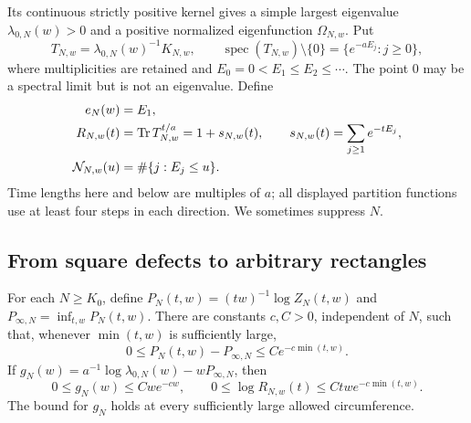 Its continuous strictly positive kernel gives a simple largest
eigenvalue $\lambda_{0,N}(w)>0$ and a positive normalized eigenfunction
$\Omega_{N,w}$.  Put
\begin{equation}
 T_{N,w}=\lambda_{0,N}(w)^{-1}K_{N,w},\qquad
 \operatorname{spec}(T_{N,w})\setminus\{0\}
     =\{e^{-aE_j}:j\ge0\},
 \label{tra:energies}
\end{equation}
where multiplicities are retained and $E_0=0<E_1\le E_2\le\cdots$.
The point $0$ may be a spectral limit but is not an eigenvalue.
Define
\begin{equation}
 \begin{split}
 e_N(w)&=E_1,\\
 R_{N,w}(t)&=\operatorname{Tr} T_{N,w}^{t/a}=1+s_{N,w}(t),
 \qquad s_{N,w}(t)=\sum_{j\ge1}e^{-tE_j},\\
 \mathcal N_{N,w}(u)&=\#\{j:E_j\le u\}.
 \end{split}
 \label{tra:notation}
\end{equation}
Time lengths here and below are multiples of $a$; all displayed
partition functions use at least four steps in each direction.
We sometimes suppress $N$.

\subsection{From square defects to arbitrary rectangles}

\begin{lemma}
\label{tra:pressure}
For each $N\ge K_0$, define
$P_N(t,w)=(tw)^{-1}\log Z_N(t,w)$ and
$P_{\infty,N}=\inf_{t,w}P_N(t,w)$.
There are constants $c,C>0$, independent of $N$, such that, whenever
$\min(t,w)$ is sufficiently large,
\begin{equation}
 0\le P_N(t,w)-P_{\infty,N}
       \le Ce^{-c\min(t,w)}.
 \label{tra:pressure-bound}
\end{equation}
If
$g_N(w)=a^{-1}\log\lambda_{0,N}(w)-wP_{\infty,N}$, then
\begin{equation}
 0\le g_N(w)\le Cwe^{-cw},\qquad
 0\le\log R_{N,w}(t)\le Ctwe^{-c\min(t,w)}.
 \label{tra:trace}
\end{equation}
The bound for $g_N$ holds at every sufficiently large allowed
circumference.
\end{lemma}

